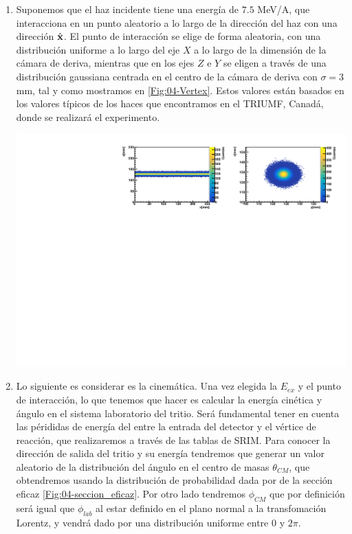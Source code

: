 \begin{enumerate}
    

    \item  Suponemos que el haz incidente tiene una energía de $7.5$ MeV/A, que interacciona en un punto aleatorio a lo largo de la dirección del haz con una dirección $\hat{\mathbf{x}}$. El punto de interacción se elige de forma aleatoria, con una distribución uniforme a lo largo del eje $X$ a lo largo de la dimensión de la cámara de deriva, mientras que en los ejes $Z$ e $Y$ se eligen a través de una distribución gaussiana centrada en el centro de la cámara de deriva con $\sigma= 3$ mm, tal y como mostramos en \cref{Fig:04-Vertex}. Estos valores están basados en los valores típicos de los haces que encontramos en el TRIUMF, Canadá, donde se realizará el experimento.  


    \begin{center}
        \includegraphics[width=1\linewidth]{Imagenes/Kinematics/Vertex_Ex0.00_incIdx0.pdf}
        \label{Fig:04-Vertex}
    \end{center}
    
    

    \item Lo siguiente es considerar es la cinemática. Una vez elegida la $E_{ex}$ y el punto de interacción, lo que tenemos que hacer es calcular la energía cinética y ángulo en el sistema laboratorio del tritio. Será fundamental tener en cuenta las pérididas de energía del \litioOnce entre la entrada del detector y el vértice de reacción, que realizaremos a través de las tablas de SRIM. Para conocer la dirección de salida del tritio y su energía tendremos que generar un valor aleatorio de la distribución del ángulo en el centro de masas $\theta_{CM}$, que obtendremos usando la distribución de probabilidad dada por de la sección eficaz \cref{Fig:04-seccion_eficaz}. Por otro lado tendremos $\phi_{CM}$ que por definición será igual que $\phi_{lab}$ al estar definido en el plano normal a la transfomación Lorentz, y vendrá dado por una distribución uniforme entre $0$ y $2\pi$. 
    

\end{enumerate}
